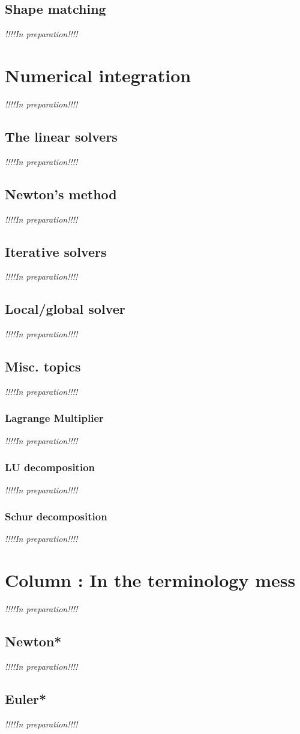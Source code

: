 \documentclass[pdflatex,sn-mathphys-num]{sn-jnl}%
\theoremstyle{thmstyleone}%
\theoremstyle{thmstyletwo}%
\theoremstyle{thmstylethree}%
\newcommand{\inprep}{
	\begin{center}
		\sl\rm {!!!!In preparation!!!!}
\end{center}}
\begin{document}
\subsection{Shape matching}
\inprep

\section{Numerical integration}
\inprep
\subsection{The linear solvers}
\inprep
\subsection{Newton's method}
\inprep
\subsection{Iterative solvers}
\inprep
\subsection{Local/global solver}
\inprep
\subsection{Misc. topics}
\inprep
\subsubsection{Lagrange Multiplier}
\inprep
\subsubsection{LU decomposition}
\inprep
\subsubsection{Schur decomposition}
\inprep

\section{Column : In the terminology mess}
\inprep
\subsection{Newton*}
\inprep
\subsection{Euler*}
\inprep
\end{document}
